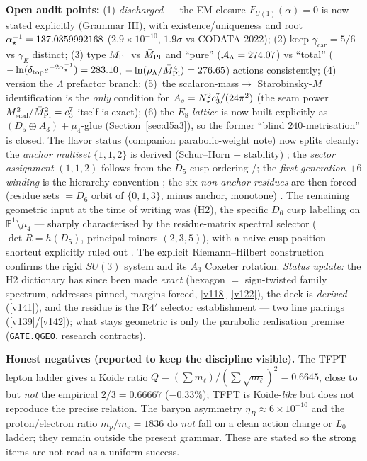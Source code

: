 \noindent\textbf{Open audit points:} (1) \emph{discharged} --- the EM closure $F_{U(1)}(\alpha)=0$ is now
stated explicitly (Grammar III), with existence/uniqueness and root $\alpha^{-1}_\star=137.0359992168$
($2.9\times10^{-10}$, $1.9\sigma$ vs CODATA-2022); (2) keep $\gamma_{\mathrm{car}}=5/6$ vs $\gamma_E$ distinct; (3) type $M_{\mathrm{Pl}}$ vs $\bar M_{\mathrm{Pl}}$ and ``pure''
($\mathcal A_\Lambda=274.07$) vs ``total'' ($-\ln(\delta_{\mathrm{top}} e^{-2\alpha^{-1}_\star})=283.10$, $-\ln(\rho_\Lambda/\bar M_{\mathrm{Pl}}^4)=276.65$)
actions consistently; (4) version the $\Lambda$ prefactor branch; (5)~the scalaron-mass$\to$
Starobinsky-$M$ identification is the \emph{only} condition for $A_s=N_\star^2c_3^7/(24\pi^2)$
(the seam power $M_{\mathrm{scal}}^2/\bar M_{\mathrm{Pl}}^2=c_3^7$ itself is exact); (6) the $E_8$ \emph{lattice} is
now built explicitly as $(D_5\oplus A_3)+\mu_4$-glue (Section~\ref{sec:d5a3}), so the former ``blind
$240$-metrisation'' is closed. The flavor status (companion parabolic-weight note) now splits cleanly:
the \emph{anchor multiset} $\{1,1,2\}$ is derived (Schur--Horn $+$ stability) \mE; the \emph{sector
assignment} $(1,1,2)$ follows from the $D_5$ cusp ordering \mE/\mC; the \emph{first-generation $+6$
winding} is the hierarchy convention \mC; the six \emph{non-anchor residues} are then forced (residue
sets $=D_6$ orbit of $\{0,1,3\}$, minus anchor, monotone) \mE. The remaining geometric input at the time
of writing was (H2), the specific $D_6$ cusp labelling on $\mathbb P^1\setminus\mu_4$ --- sharply
characterised by the residue-matrix spectral selector ($\det R=h(D_5)$, principal minors $(2,3,5)$),
with a naive cusp-position shortcut explicitly ruled out \mC. The explicit Riemann--Hilbert construction
confirms the rigid $SU(3)$ system and its $A_3$ Coxeter rotation. \emph{Status update:} the H2
dictionary has since been made \emph{exact} (hexagon $=$ sign-twisted family spectrum, addresses pinned,
margins forced, \vref{v118}--\vref{v122}), the deck is \emph{derived} (\vref{v141}), and the residue is
the R4$'$ selector establishment --- two line pairings (\vref{v139}/\vref{v142}); what stays geometric is
only the parabolic realisation premise (\texttt{GATE.QGEO}, research contracts).

\medskip
\noindent\textbf{Honest negatives (reported to keep the discipline visible).} The TFPT lepton ladder
gives a Koide ratio $Q=(\sum m_\ell)/(\sum\sqrt{m_\ell})^2=0.6645$, close to but \emph{not} the
empirical $2/3=0.66667$ ($-0.33\%$); TFPT is Koide-\emph{like} but does not reproduce the precise
relation. The baryon asymmetry $\eta_B\approx6\times10^{-10}$ and the proton/electron ratio
$m_p/m_e=1836$ do \emph{not} fall on a clean action charge or $L_0$ ladder; they remain outside the
present grammar. These are stated so the strong items are not read as a uniform success.

